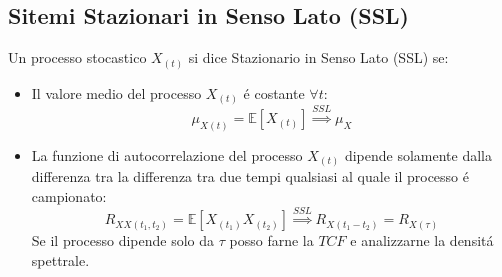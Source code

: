     \subsection{Sitemi Stazionari in Senso Lato (SSL)}\label{Sitemi Stazionari in Senso Lato (SSL)}
        Un processo stocastico $X_{(t)}$ si dice Stazionario in Senso Lato (SSL) se:
        \begin{itemize}
            \item {Il valore medio del processo $X_{(t)}$ é costante $\forall t$:
                \[
                    \mu_{X(t)} = \mathbb{E}[X_{(t)}] \overset{SSL}{\Rightarrow} \mu_{X}    
                \]
            }
            \item {La funzione di autocorrelazione del processo $X_{(t)}$ dipende solamente dalla differenza tra la differenza 
                tra due tempi qualsiasi al quale il processo é campionato:
                \[
                    R_{XX(t_1,t_2)} = \mathbb{E}[X_{(t_1)}X_{(t_2)}] \overset{SSL}{\Rightarrow} R_{X(t_1-t_2)} = R_{X(\tau)}      
                \]
                Se il processo dipende solo da $\tau$ posso farne la $TCF$ e analizzarne la densitá spettrale. 
                }
        \end{itemize} 
